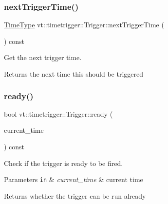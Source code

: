 \subsubsection{\texorpdfstring{next\+Trigger\+Time()}{nextTriggerTime()}}
{\footnotesize\ttfamily \hyperlink{namespacevt_a2b9f28078dc309ad0706b69ded743e69}{Time\+Type} vt\+::timetrigger\+::\+Trigger\+::next\+Trigger\+Time (\begin{DoxyParamCaption}{ }\end{DoxyParamCaption}) const\hspace{0.3cm}{\ttfamily [inline]}}



Get the next trigger time. 

\begin{DoxyReturn}{Returns}
the next time this should be triggered 
\end{DoxyReturn}
\mbox{\label{structvt_1_1timetrigger_1_1_trigger_af00027850254b42fbcc2f5fde829b386}} 
\subsubsection{\texorpdfstring{ready()}{ready()}}
{\footnotesize\ttfamily bool vt\+::timetrigger\+::\+Trigger\+::ready (\begin{DoxyParamCaption}\item[{\hyperlink{namespacevt_a2b9f28078dc309ad0706b69ded743e69}{Time\+Type}}]{current\+\_\+time }\end{DoxyParamCaption}) const\hspace{0.3cm}{\ttfamily [inline]}}



Check if the trigger is ready to be fired. 


\begin{DoxyParams}[1]{Parameters}
\mbox{\tt in}  & {\em current\+\_\+time} & current time\\
\hline
\end{DoxyParams}
\begin{DoxyReturn}{Returns}
whether the trigger can be run already 
\end{DoxyReturn}
\mbox{\label{structvt_1_1timetrigger_1_1_trigger_a44688f64be94b9c821768b55a3a236f7}} 
